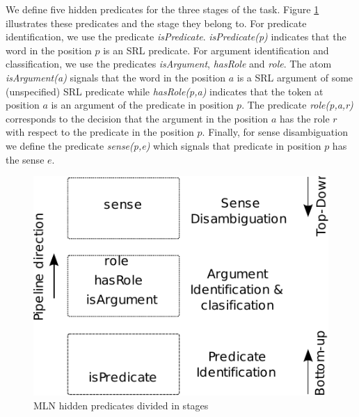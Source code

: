 

We define five hidden predicates for the three stages of the task. Figure \ref{fig:achitecture} illustrates these predicates and the stage they belong to. 
For predicate identification, we use the predicate \emph{isPredicate}. \emph{isPredicate(p)} indicates that the word in the position $p$ is an SRL predicate.
For argument identification and classification, we use the predicates \emph{isArgument}, \emph{hasRole} and \emph{role}. The atom \emph{isArgument(a)} signals that the word in the position $a$ is a SRL argument of some (unspecified) SRL predicate while \emph{hasRole(p,a)} indicates that the token at position $a$ is an argument of the predicate in position $p$. The predicate \emph{role(p,a,r)} corresponds to the decision that the argument in the position $a$ has the role $r$ with respect to the predicate in the position $p$. Finally, for sense disambiguation we  define the predicate \emph{sense(p,e)} which signals that predicate in position $p$ has the sense $e$. 

\begin{figure}
\begin{center}
    \includegraphics[scale=.70]{TaskArchitecture}
\end{center}
\caption{MLN hidden predicates divided in stages}
\label{fig:achitecture}
\end{figure}


